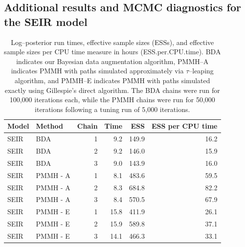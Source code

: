 \subsection{Additional results and MCMC diagnostics for the SEIR model}

\begin{table}[htbp]
	\centering
	\begin{tabular}{llrrrr}
		\hline
		Model & Method & Chain & Time & ESS & ESS per CPU time \\ 
		\hline
		SEIR & BDA &  1 & 9.2 & 149.9 & 16.2 \\ 
		SEIR & BDA &  2 & 9.2 & 146.0 & 15.9 \\ 
		SEIR & BDA &  3 & 9.0 & 143.9 & 16.0 \\ 
		SEIR & PMMH - A &  1 & 8.1 & 483.6 & 59.5 \\ 
		SEIR & PMMH - A &  2 & 8.3 & 684.8 & 82.2 \\ 
		SEIR & PMMH - A &  3 & 8.4 & 570.5 & 67.9 \\ 
		SEIR & PMMH - E &  1 & 15.8 & 411.9 & 26.1 \\ 
		SEIR & PMMH - E &  2 & 15.9 & 589.8 & 37.1 \\ 
		SEIR & PMMH - E &  3 & 14.1 & 466.3 & 33.1 \\ 
		\hline
	\end{tabular}
	\caption{Log--posterior run times, effective sample sizes (ESSs), and effective sample sizes per CPU time measure in hours (ESS.per.CPU.time). BDA indicates our Bayesian data augmentation algorithm, PMMH--A indicates PMMH with paths simulated approximately via $ \tau $--leaping algorithm, and PMMH--E indicates PMMH with paths simulated exactly using Gillespie's direct algorithm. The BDA chains were run for 100,000 iterations each, while the PMMH chains were run for 50,000 iterations following a tuning run of 5,000 iterations.}
	\label{tab:sim1_seir_ess}
\end{table}

